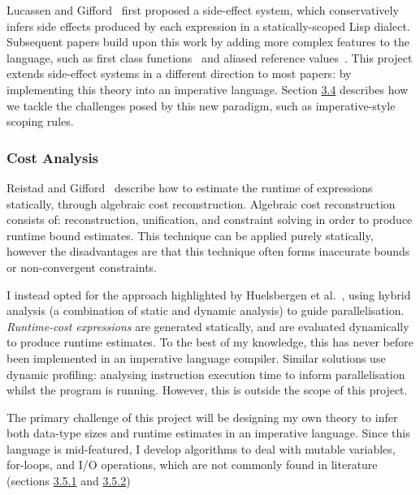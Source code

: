 Lucassen and Gifford~\cite{10.1145/73560.73564} first proposed a side-effect system, which conservatively infers side effects produced by each expression in a statically-scoped Lisp dialect. Subsequent papers build upon this work by adding more complex features to the language, such as first class functions~\cite{article} and aliased reference values~\cite{talpin_jouvelot_1992}.  This project extends side-effect systems in a different direction to most papers: by implementing this theory into an imperative language. Section \hyperref[sec:3.4]{3.4} describes how we tackle the challenges posed by this new paradigm, such as imperative-style scoping rules.

\vspace{-3mm}

\subsubsection*{Cost Analysis}

\vspace{-3mm}

Reistad and Gifford~\cite{DBLP:conf/lfp/ReistadG94} describe how to estimate the runtime of expressions statically, through algebraic cost reconstruction. Algebraic cost reconstruction consists of: reconstruction, unification, and constraint solving in order to produce runtime bound estimates. This technique can be applied purely statically, however the disadvantages are that this technique often forms inaccurate bounds or non-convergent constraints.

I instead opted for the approach highlighted by Huelsbergen et al.~\cite{Huelsbergen1994UsingTR}, using hybrid analysis (a combination of static and dynamic analysis) to guide parallelisation. \textit{Runtime-cost expressions} are generated statically, and are evaluated dynamically to produce runtime estimates. To the best of my knowledge, this has never before been implemented in an imperative language compiler. Similar solutions use dynamic profiling: analysing instruction execution time to inform parallelisation whilst the program is running. However, this is outside the scope of this project.

The primary challenge of this project will be designing my own theory to infer both data-type sizes and runtime estimates in an imperative language. Since this language is mid-featured, I develop algorithms to deal with mutable variables, for-loops, and I/O operations, which are not commonly found in literature (sections \hyperref[sec:3.5.1]{3.5.1} and \hyperref[sec:3.5.2]{3.5.2})

